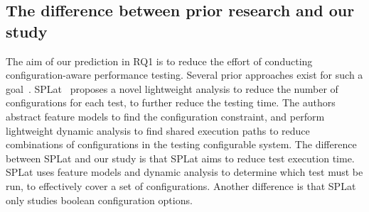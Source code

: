 \subsection{The difference between prior research and our study}
The aim of our prediction in RQ1 is to reduce the effort of conducting configuration-aware performance testing. Several prior approaches exist for such a goal~\cite{DBLP:conf/sigsoft/KimMKBSBd13,DBLP:conf/icse/MedeirosKRGA16}. SPLat~\cite{DBLP:conf/sigsoft/KimMKBSBd13} proposes a novel lightweight analysis to reduce the number of configurations for each test, to further reduce the testing time. The authors abstract feature models to find the configuration constraint, and perform lightweight dynamic analysis to find shared execution paths to reduce combinations of configurations in the testing configurable system. The difference between SPLat and our study is that SPLat aims to reduce test execution time. SPLat uses feature models and dynamic analysis to determine which test must be run, to effectively cover a set of configurations. Another difference is that SPLat only studies boolean configuration options. 
